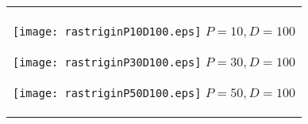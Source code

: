 \documentclass[a4paper,11pt,oneside,openany]{jsbook}
\begin{document}
\begin{figure}[htbp]
  \begin{center}
    \begin{tabular}{c}


      \begin{minipage}{0.33\hsize}
        \begin{center}
          \texttt{[image: rastriginP10D100.eps]}
          \hspace{1.2cm} $P=10, D=100$
        \end{center}
      \end{minipage}

      \begin{minipage}{0.33\hsize}
        \begin{center}
          \texttt{[image: rastriginP30D100.eps]}
          \hspace{1.2cm} $P=30, D=100$
        \end{center}
      \end{minipage}

      \begin{minipage}{0.33\hsize}
        \begin{center}
          \texttt{[image: rastriginP50D100.eps]}
          \hspace{1.2cm} $P=50, D=100$
        \end{center}
      \end{minipage}
    \end{tabular}
    \label{fig:lena}
  \end{center}
\end{figure}
\end{document}
